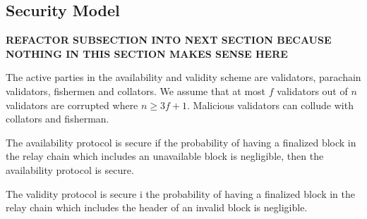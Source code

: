 \subsection{Security Model}

{\bf REFACTOR SUBSECTION INTO NEXT SECTION BECAUSE NOTHING IN THIS SECTION MAKES SENSE HERE}



The active parties in the availability and validity scheme are validators, parachain validators, fishermen and collators. We assume that at most $ f $ validators out of $ n $ validators are corrupted where $n \geq 3f+1$. Malicious validators can collude with collators and fisherman. 






\begin{definition} The availability protocol is secure if the probability of having a finalized block in the relay chain which includes an unavailable block is negligible, then the availability protocol is secure.
\end{definition}

\begin{definition}
The validity protocol is secure i the probability of having a finalized block in the relay chain which includes the header of an invalid block is negligible.
\end{definition}






